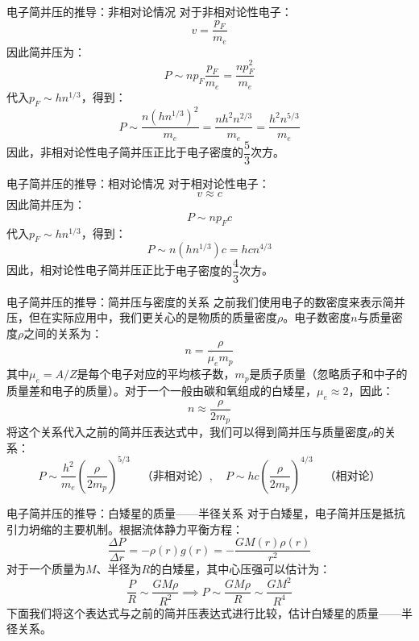 \documentclass[10pt,aspectratio=1610]{beamer}
\begin{document}
\begin{frame}{电子简并压的推导：非相对论情况}
    对于\textcolor{mari}{非相对论性电子：
    \[
        v = \frac{p_F}{m_e}
    \]
    }
    因此简并压为：
    \[
        P \sim n p_F \frac{p_F}{m_e} = \frac{n p_F^2}{m_e}
    \]
    代入$p_F \sim h n^{1/3}$，得到：
    \textcolor{mari}{
    \[
        P \sim \frac{n (h n^{1/3})^2}{m_e} = \frac{n h^2 n^{2/3}}{m_e} = \frac{h^2 n^{5/3}}{m_e}
    \]
    }
    因此，非相对论性电子简并压正比于\textcolor{dia}{电子密度的$\dfrac{5}{3}$次方}。
\end{frame}

\begin{frame}{电子简并压的推导：相对论情况}
    对于\textcolor{mari}{相对论性电子：
    \[
        v \approx c
    \]
    }
    因此简并压为：
    \[
        P \sim n p_F c
    \]
    代入$p_F \sim h n^{1/3}$，得到：
    \textcolor{mari}{
    \[
        P \sim n (h n^{1/3}) c = h c n^{4/3}
    \]
    }
    因此，相对论性电子简并压正比于\textcolor{dia}{电子密度的$\dfrac{4}{3}$次方}。
\end{frame}

\begin{frame}{电子简并压的推导：简并压与密度的关系}
    之前我们使用电子的数密度来表示简并压，但在实际应用中，我们更关心的是物质的质量密度$\rho$。电子数密度$n$与质量密度$\rho$之间的关系为：
    \[
        n = \frac{\rho}{\mu_e m_p}
    \]
    其中$\mu_e = A/Z$是每个电子对应的平均核子数，$m_p$是质子质量（忽略质子和中子的质量差和电子的质量）。对于一个一般由碳和氧组成的白矮星，$\mu_e \approx 2$，因此：
    \[
        n \approx \frac{\rho}{2 m_p}
    \]
    将这个关系代入之前的简并压表达式中，我们可以得到简并压与质量密度$\rho$的关系：
    \textcolor{dia}{
    \[
        P \sim \frac{h^2}{m_e} \left(\frac{\rho}{2 m_p}\right)^{5/3} \quad \text{（非相对论）},\quad
        P \sim h c \left(\frac{\rho}{2 m_p}\right)^{4/3} \quad \text{（相对论）}
    \]
    }
\end{frame}

\begin{frame}{电子简并压的推导：白矮星的质量——半径关系}
    对于白矮星，电子简并压是抵抗引力坍缩的主要机制。根据流体静力平衡方程：
    \textcolor{mari}{
    \[
        \frac{\Delta P}{\Delta r} = -\rho(r)g(r) = -\frac{G M(r) \rho(r)}{r^2}
    \]
    }
    对于一个质量为$M$、半径为$R$的白矮星，其中心压强可以估计为：
    \textcolor{mari}{
    \[
        \frac{P}{R} \sim \frac{G M \rho}{R^2} \implies P \sim \frac{G M \rho}{R} \sim \frac{G M^2}{R^4}
    \]
    }
    下面我们将这个表达式与之前的简并压表达式进行比较，估计白矮星的质量——半径关系。
\end{frame}
\end{document}
